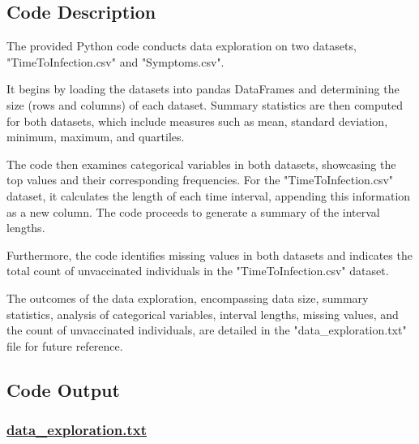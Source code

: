 \documentclass[11pt]{article}
\begin{document}
\subsection{Code Description}

The provided Python code conducts data exploration on two datasets, "TimeToInfection.csv" and "Symptoms.csv". 

It begins by loading the datasets into pandas DataFrames and determining the size (rows and columns) of each dataset. Summary statistics are then computed for both datasets, which include measures such as mean, standard deviation, minimum, maximum, and quartiles.

The code then examines categorical variables in both datasets, showcasing the top values and their corresponding frequencies. For the "TimeToInfection.csv" dataset, it calculates the length of each time interval, appending this information as a new column. The code proceeds to generate a summary of the interval lengths.

Furthermore, the code identifies missing values in both datasets and indicates the total count of unvaccinated individuals in the "TimeToInfection.csv" dataset.

The outcomes of the data exploration, encompassing data size, summary statistics, analysis of categorical variables, interval lengths, missing values, and the count of unvaccinated individuals, are detailed in the "data\_exploration.txt" file for future reference.

\subsection{Code Output}\hypertarget{file-data-exploration-txt}{}

\subsubsection*{\hyperlink{code-Data Exploration-data-exploration-txt}{data\_exploration.txt}}
\end{document}
